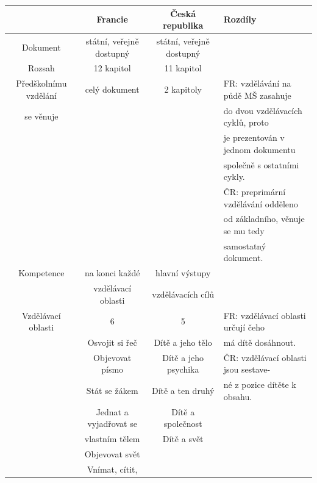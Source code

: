 \begin{landscape}
\begin{table}[t]
\center
\begin{tabular}{|c|c|c|l|}
\rowcolor{grey}
\hline			
				& \textbf{Francie}			& \textbf{Česká republika}	& \textbf{Rozdíly} 	\\
\hline
\hline
\rowcolor{grey!10}
Dokument	& státní, veřejně dostupný		& státní, veřejně dostupný 	& 			\\	\rowcolor{grey!50}
Rozsah		& 12 kapitol	 				& 11 kapitol	&						\\  \rowcolor{grey!10}
Předškolnímu vzdělání	& celý dokument			& 2 kapitoly	& FR: vzdělávání na půdě MŠ  zasahuje 	\\ \rowcolor{grey!10}
se věnuje				&						&				& do dvou vzdělávacích cyklů, proto  	\\ \rowcolor{grey!10}
				&								& 				& je prezentován v jednom dokumentu  	\\ \rowcolor{grey!10}
				&								&				& společně s ostatními cykly.    		\\ \rowcolor{grey!10}
				&								&				& ČR: preprimární vzdělávání odděleno 	\\ \rowcolor{grey!10}
				&								&				& od základního, věnuje se mu tedy  	\\ \rowcolor{grey!10}
				&								&				& samostatný dokument.					\\ 
\rowcolor{grey!50}
Kompetence		& na konci každé 				& hlavní výstupy  	&		\\	\rowcolor{grey!50}
				& vzdělávací oblasti 			& vzdělávacích cílů & 		\\
\rowcolor{grey!10}
Vzdělávací oblasti	& 6							& 5 					& FR: vzdělávací oblasti určují čeho 	\\	
\rowcolor{grey!10}
					& Osvojit si řeč			& Dítě a jeho tělo		& má dítě dosáhnout.					\\
\rowcolor{grey!10}
					& Objevovat písmo 			& Dítě a jeho psychika	& ČR: vzdělávací oblasti jsou sestave- \\
\rowcolor{grey!10}
					& Stát se žákem				& Dítě a ten druhý	 	& né z pozice dítěte k obsahu. 			\\
\rowcolor{grey!10}
					& Jednat a vyjadřovat se 	& Dítě a společnost 	& 	 									\\
\rowcolor{grey!10}
					& vlastním tělem			& Dítě a svět			& 	 									\\
\rowcolor{grey!10}
					& Objevovat svět			& 			 			& 	\\	
\rowcolor{grey!10}
					& Vnímat, cítit, 			& 						& 	\\

\end{tabular}
\end{table}
\end{landscape}

